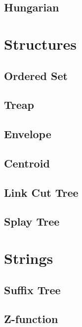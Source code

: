 \documentclass[a4paper,oneside]{article}
\begin{document}
\subsection{Hungarian}


\section{Structures}
\subsection{Ordered Set}


\subsection{Treap}


\subsection{Envelope}


\subsection{Centroid}


\subsection{Link Cut Tree}


\subsection{Splay Tree}


\section{Strings}
\subsection{Suffix Tree}


\subsection{Z-function}

\end{document}

